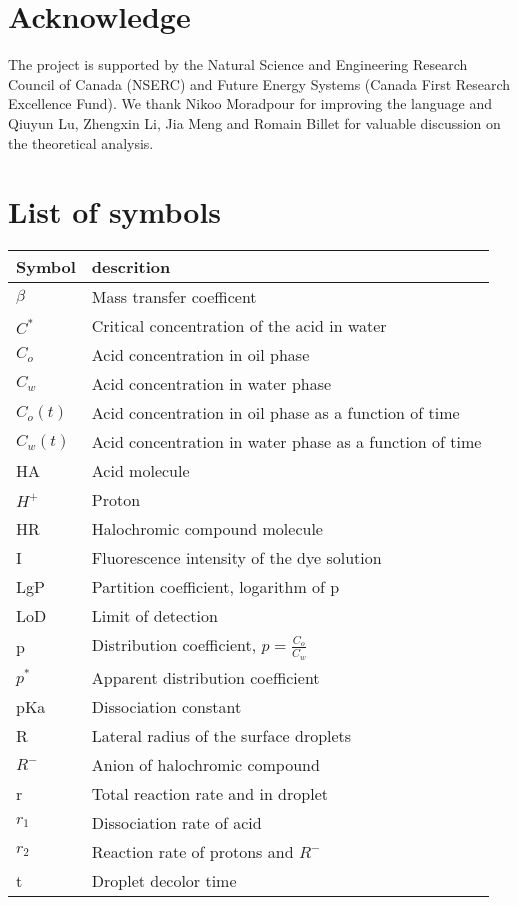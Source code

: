 \documentclass[journal=langd5,manuscript=article]{achemso}
\begin{document}
\section{Acknowledge}
The project is supported by the Natural Science and Engineering Research Council of Canada (NSERC) and Future Energy Systems (Canada First Research Excellence Fund). We thank Nikoo Moradpour for improving the language and Qiuyun Lu, Zhengxin Li, Jia Meng and Romain Billet for valuable discussion on the theoretical analysis.
\section{List of symbols}
\begin{table}[]
 \centering
\begin{tabular}{p{2.5cm}|p{10cm}}
Symbol & descrition \\
\hline
$\beta$& Mass transfer coefficent\\
$C^*$& Critical concentration of the acid in water\\
$C_o$& Acid concentration in oil phase\\
$C_w$& Acid concentration in water phase\\
$C_o(t)$& Acid concentration in oil phase as a function of time\\
$C_w(t)$& Acid concentration in water phase as a function of time\\
HA& Acid molecule\\
$H^+$& Proton\\
HR& Halochromic compound molecule\\
I& Fluorescence intensity of the dye solution\\
LgP& Partition coefficient, logarithm of p\\
LoD& Limit of detection\\
p & Distribution coefficient, $p=\frac{C_o}{C_w}$\\
$p^*$ & Apparent distribution coefficient\\
pKa& Dissociation constant\\
R& Lateral radius of the surface droplets\\
$R^-$& Anion of halochromic compound\\
r& Total reaction rate and in droplet\\
$r_1$& Dissociation rate of acid\\
$r_2$& Reaction rate of protons and $R^-$\\
t& Droplet decolor time\\
\end{tabular}
\label{tt}
\end{table}
\end{document}
